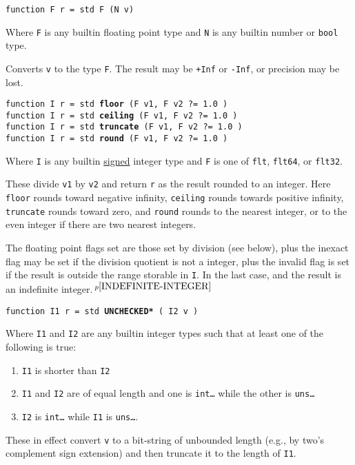 \documentclass[12pt]{article}
\newcommand{\ttkey}[1]{{\tt \bfseries #1}}
\newcommand{\pagnote}[1]{$\,^{p\pageref{#1}}$}
\newenvironment{indpar}[1][0.3in]%
	{\begin{list}{}%
		     {\setlength{\itemsep}{0in}%
		      \setlength{\topsep}{0in}%
		      \setlength{\parsep}{1ex}%
		      \setlength{\labelwidth}{#1}%
		      \setlength{\leftmargin}{#1}%
		      \addtolength{\leftmargin}{\labelsep}}%
	 \item}%
	{\end{list}}
\begin{document}
{\tt function F r = std F (N v)}
\begin{indpar}
Where {\tt F} is any builtin floating point type
and {\tt N} is any builtin number or {\tt bool} type.

Converts {\tt v} to the type {\tt F}.  The result may be
{\tt +Inf} or {\tt -Inf}, or precision may be lost.
\end{indpar}

{\tt function I r = std \ttkey{floor} (F v1, F v2 ?=~1.0 )} \\
{\tt function I r = std \ttkey{ceiling} (F v1, F v2 ?=~1.0 )} \\
{\tt function I r = std \ttkey{truncate} (F v1, F v2 ?=~1.0 )} \\
{\tt function I r = std \ttkey{round} (F v1, F v2 ?=~1.0 )}
\begin{indpar}
Where {\tt I} is any builtin \underline{signed} integer type
and {\tt F} is one of {\tt flt}, {\tt flt64}, or {\tt flt32}.

These divide {\tt v1} by {\tt v2} and return {\tt r} as the
result rounded to an integer.
Here {\tt floor} rounds toward negative infinity, {\tt ceiling}
rounds towards positive infinity, {\tt truncate} rounds toward
zero, and {\tt round} rounds to the nearest integer, or to the
even integer if there are two nearest integers.

The floating point flags set are those set by division (see below), plus the
inexact flag may be set if the division quotient is not a integer, plus
the invalid flag is set if the result is outside the range storable in
{\tt I}.  In the last case, and the result is
an indefinite integer.\pagnote{INDEFINITE-INTEGER}
\end{indpar}

{\tt function I1 r = std \ttkey{*UNCHECKED*} ( I2 v )}
\begin{indpar}
Where {\tt I1} and {\tt I2} are any builtin integer types
such that at least one of the following is true:
\begin{enumerate}
\item {\tt I1} is shorter than {\tt I2}
\item {\tt I1} and {\tt I2} are of equal length and one
is {\tt int\ldots} while the other is {\tt uns\ldots}
\item {\tt I2} is {\tt int\ldots} while {\tt I1} is {\tt uns\ldots}.
\end{enumerate}

These in effect convert {\tt v} to a bit-string of unbounded length (e.g., by
two's complement sign extension) and
then truncate it to the length of {\tt I1}.
\end{indpar}
\end{document}
